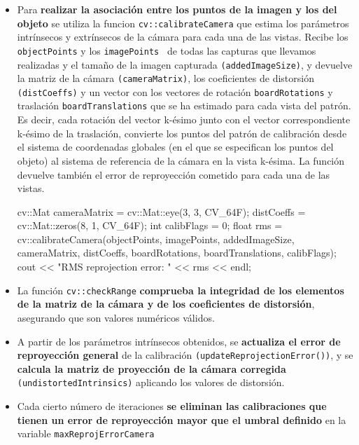 \begin{itemize}
\item Para \textbf{realizar la asociación entre los puntos de la imagen y los del objeto} se utiliza la funcion \texttt{cv::calibrateCamera} que estima los parámetros intrínsecos y extrínsecos de la cámara para cada una de las vistas. Recibe los \texttt{objectPoints} y los \texttt{imagePoints } de todas las capturas que llevamos realizadas y el tamaño de la imagen capturada \texttt{(addedImageSize)}, y devuelve la matriz de la cámara \texttt{(cameraMatrix)}, los coeficientes de distorsión \texttt{(distCoeffs)} y un vector con los vectores de rotación \texttt{boardRotations} y traslación \texttt{boardTranslations} que se ha estimado para cada vista del patrón. Es decir, cada rotación del vector k-ésimo junto con el vector correspondiente k-ésimo de la traslación, convierte los puntos del patrón de calibración desde el sistema de coordenadas globales (en el que se especifican los puntos del objeto) al sistema de referencia de la cámara en la vista k-ésima. La función devuelve también el error de reproyección cometido para cada una de las vistas.

\begin{listing}[
  float=ht,
  language = C++,
  caption  = {Calibrado de la cámara mediante \texttt{cv::calibrateCamera} },
   label    = code:calibrateCamera]
   cv::Mat cameraMatrix = cv::Mat::eye(3, 3, CV_64F);
   distCoeffs = cv::Mat::zeros(8, 1, CV_64F);
   int calibFlags = 0;
   float rms = cv::calibrateCamera(objectPoints, imagePoints, addedImageSize, cameraMatrix, distCoeffs, boardRotations, boardTranslations, calibFlags);
   cout << "RMS reprojection error: " << rms << endl;
 \end{listing}

\item La función \texttt{cv::checkRange} \textbf{comprueba la integridad de los elementos de la matriz de la cámara y de los coeficientes de distorsión}, asegurando que son valores numéricos válidos. 

\item A partir de los parámetros intrínsecos obtenidos, se \textbf{actualiza el error de reproyección general} de la calibración \texttt{(updateReprojectionError())}, y se \textbf{calcula la matriz de proyección de la cámara corregida} \texttt{(undistortedIntrinsics)} aplicando los valores de distorsión.
  
\item Cada cierto número de iteraciones \textbf{se eliminan las calibraciones que tienen un error de reproyección mayor que el umbral definido} en la variable \texttt{maxReprojErrorCamera}
      

\end{itemize}
